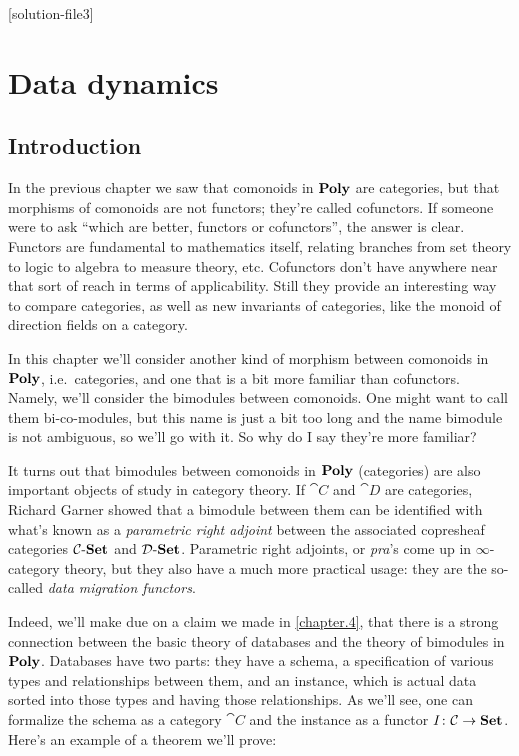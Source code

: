 \documentclass[Book-Poly]{subfiles}
\begin{document}
%


\setcounter{chapter}{2}%
[solution-file3]

\chapter{Data dynamics}\label{chapter.6} 

\section{Introduction}\label{sec.c6_intro}


In the previous chapter we saw that comonoids in $\textbf{Poly}$ are categories, but that morphisms of comonoids are not functors; they're called cofunctors. If someone were to ask ``which are better, functors or cofunctors'', the answer is clear. Functors are fundamental to mathematics itself, relating branches from set theory to logic to algebra to measure theory, etc. Cofunctors don't have anywhere near that sort of reach in terms of applicability. Still they provide an interesting way to compare categories, as well as new invariants of categories, like the monoid of direction fields on a category.

In this chapter we'll consider another kind of morphism between comonoids in $\textbf{Poly}$, i.e.\ categories, and one that is a bit more familiar than cofunctors. Namely, we'll consider the bimodules between comonoids. One might want to call them bi-co-modules, but this name is just a bit too long and the name bimodule is not ambiguous, so we'll go with it. So why do I say they're more familiar?

It turns out that bimodules between comonoids in $\textbf{Poly}$ (categories) are also important objects of study in category theory. If $\cat{C}$ and $\cat{D}$ are categories, Richard Garner showed that a bimodule between them can be identified with what's known as a \emph{parametric right adjoint} between the associated copresheaf categories $\mathcal{C}\textnormal{-}\textbf{Set}$ and $\mathcal{D}\textnormal{-}\textbf{Set}$. Parametric right adjoints, or \emph{pra}'s come up in $\infty$-category theory, but they also have a much more practical usage: they are the so-called \emph{data migration functors}.

Indeed, we'll make due on a claim we made in \cref{chapter.4}, that there is a strong connection between the basic theory of databases and the theory of bimodules in $\textbf{Poly}$. Databases have two parts: they have a schema, a specification of various types and relationships between them, and an instance, which is actual data sorted into those types and having those relationships. As we'll see, one can formalize the schema as a category $\cat{C}$ and the instance as a functor $I\colon\mathcal{C}\to\textbf{Set}$. Here's an example of a theorem we'll prove:
\end{document}
